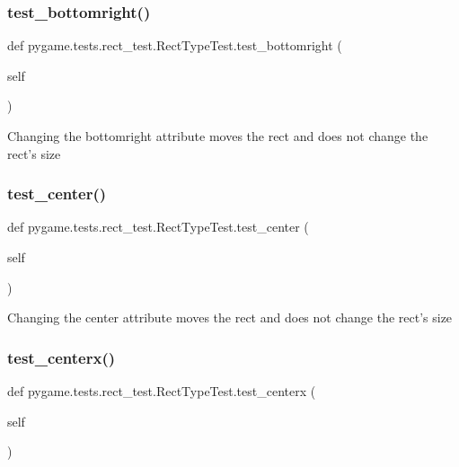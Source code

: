 \subsubsection{\texorpdfstring{test\+\_\+bottomright()}{test\_bottomright()}}
{\footnotesize\ttfamily def pygame.\+tests.\+rect\+\_\+test.\+Rect\+Type\+Test.\+test\+\_\+bottomright (\begin{DoxyParamCaption}\item[{}]{self }\end{DoxyParamCaption})}

\begin{DoxyVerb}Changing the bottomright attribute moves the rect and does not change
   the rect's size
\end{DoxyVerb}
 \mbox{\label{classpygame_1_1tests_1_1rect__test_1_1_rect_type_test_a116d7f592745f87bbff6dbb150189adf}} 
\subsubsection{\texorpdfstring{test\+\_\+center()}{test\_center()}}
{\footnotesize\ttfamily def pygame.\+tests.\+rect\+\_\+test.\+Rect\+Type\+Test.\+test\+\_\+center (\begin{DoxyParamCaption}\item[{}]{self }\end{DoxyParamCaption})}

\begin{DoxyVerb}Changing the center attribute moves the rect and does not change
   the rect's size
\end{DoxyVerb}
 \mbox{\label{classpygame_1_1tests_1_1rect__test_1_1_rect_type_test_aaf8a8ea0637ee0f4b00afc6395f225d5}} 
\subsubsection{\texorpdfstring{test\+\_\+centerx()}{test\_centerx()}}
{\footnotesize\ttfamily def pygame.\+tests.\+rect\+\_\+test.\+Rect\+Type\+Test.\+test\+\_\+centerx (\begin{DoxyParamCaption}\item[{}]{self }\end{DoxyParamCaption})}

